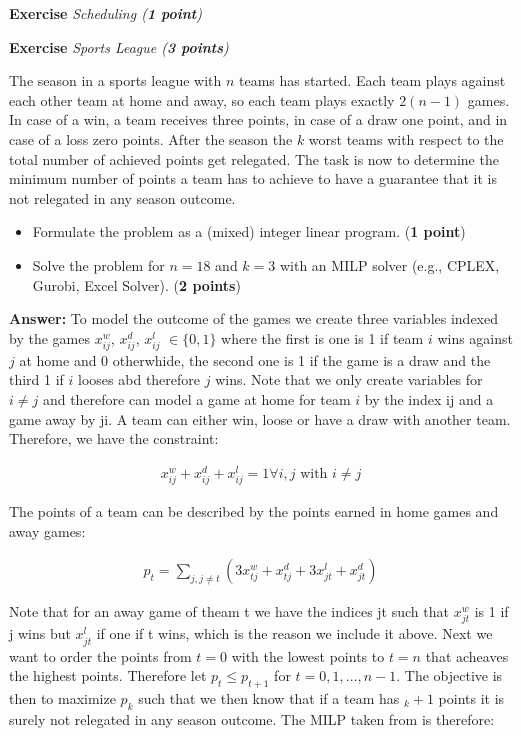\documentclass[a4paper,10pt]{article}
\newcounter{exc}
\newenvironment{exercise}[1]%
{\refstepcounter{exc}\textbf{Exercise \arabic{exc}} \emph{#1}\\}
{

\hrulefill\medskip}%
\begin{document}
\begin{exercise}{Scheduling (\textbf{1 point})}
\end{exercise}

\begin{exercise}{Sports League (\textbf{3 points})}\label{ex:sl}

The season in a sports league with $n$ teams has started. Each team plays against each other team at home and away, so each team plays exactly $2(n-1)$ games. In case of a win, a team receives three points, in case of a draw one point, and in case of a loss zero points. After the season the $k$ worst teams with respect to the total number of achieved points get relegated. The task is now to determine the minimum number of points a team has to achieve to have a guarantee that it is not relegated in any season outcome.
\begin{itemize}
\item Formulate the problem as a (mixed) integer linear program. (\textbf{1 point})
\item Solve the problem for $n=18$ and $k=3$ with an MILP solver (e.g., CPLEX, Gurobi, Excel Solver). (\textbf{2 points})
\end{itemize}

\textbf{Answer:}
To model the outcome of the games we create three variables indexed by the games $x^w_{ij}$, $x^d_{ij}$, $x^l_{ij}$ $\in\{0,1\}$ where the first is one is 1 if team $i$ wins against $j$ at home and 0 otherwhide, the second one is 1 if the game is a draw and the third 1 if $i$ looses abd therefore $j$ wins. Note that we only create variables for $i\neq j$ and therefore can model a game at home for team $i$ by the index ij and a game away by ji. A team can either win, loose or have a draw with another team. Therefore, we have the constraint:

\begin{align}
x^w_{ij}+ x^d_{ij}+ x^l_{ij} = 1 \forall i,j \text{ with } i \neq j
\end{align}

The points of a team can be described by the points earned in home games and away games:

\begin{align}
p_t = \sum_{j,j\neq t} (3x^w_{tj}+ x^d_{tj} + 3x^l_{jt}+ x^d_{jt})
\end{align}

Note that for an away game of theam t we have the indices jt such that $x^w_{jt}$ is 1 if j wins but $x^l_{jt}$ if one if t wins, which is the reason we include it above.
Next we want to order the points from $t=0$ with the lowest points to $t=n$ that acheaves the highest points. Therefore let $p_t \leq p_{t+1}$ for $t=0,1,...,n-1$. The objective is then to maximize $p_k$ such that we then know that if a team has $_k+1$ points it is surely not relegated in any season outcome.
The MILP taken from \cite{raack2013integer} is therefore:


\end{exercise}
\end{document}
